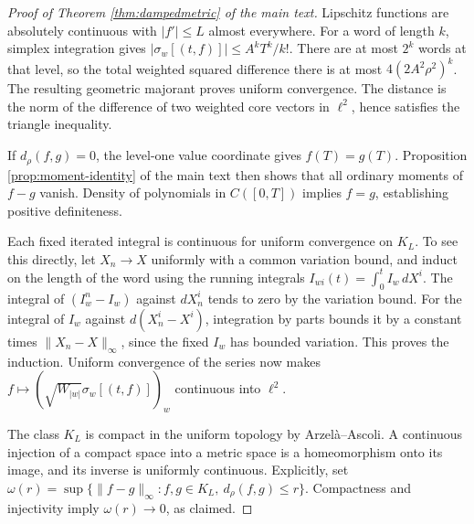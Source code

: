 \documentclass[11pt,english]{article}
\theoremstyle{definition}
\theoremstyle{remark}
\begin{document}
\begin{proof}[Proof of Theorem \ref{thm:dampedmetric} of the main text]
Lipschitz functions are absolutely continuous with $|f'|\le L$
almost everywhere. For a word of length $k$, simplex integration
gives $|\sigma_w[(t,f)]|\le A^kT^k/k!$. There are at most $2^k$
words at that level, so the total weighted squared difference there
is at most $4(2A^2\rho^2)^k$. The resulting geometric majorant
proves uniform convergence. The distance is the norm of the
difference of two weighted core vectors in $\ell^2$, hence satisfies
the triangle inequality.

If $d_\rho(f,g)=0$, the level-one value coordinate gives
$f(T)=g(T)$. Proposition \ref{prop:moment-identity} of the main text then shows that
all ordinary moments of $f-g$ vanish. Density of polynomials in
$C([0,T])$ implies $f=g$, establishing positive definiteness.

Each fixed iterated integral is continuous for uniform convergence
on $K_L$. To see this directly, let $X_n\to X$ uniformly with a
common variation bound, and induct on the length of the word using
the running integrals $I_{wi}(t)=\int_0^t I_w\,dX^i$.
The integral of $(I_w^n-I_w)$ against $dX_n^i$ tends to zero by the
variation bound. For the integral of $I_w$ against $d(X_n^i-X^i)$,
integration by parts bounds it by a constant times
$\|X_n-X\|_\infty$, since the fixed $I_w$ has bounded variation.
This proves the induction. Uniform convergence of the series now
makes $f\mapsto(\sqrt{W_{|w|}}\sigma_w[(t,f)])_w$ continuous into
$\ell^2$.

The class $K_L$ is compact in the uniform topology by
Arzel\`a--Ascoli. A continuous injection of a compact space into a
metric space is a homeomorphism onto its image, and its inverse is
uniformly continuous. Explicitly, set
$\omega(r)=\sup\{\|f-g\|_\infty:f,g\in K_L,\ d_\rho(f,g)\le r\}$.
Compactness and injectivity imply $\omega(r)\to0$, as claimed.
\end{proof}
\end{document}
